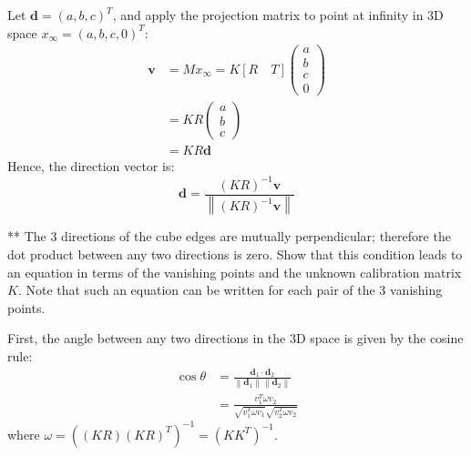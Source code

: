\begin{questions}
\begin{parts}
\begin{subparts}
    \begin{solution}
        Let $\mathbf{d}=(a, b, c) ^ {T}$, and apply the projection matrix to point at infinity in 3D space $x _ {\infty} = (a, b, c, 0) ^ {T}$:
        \begin{equation}
                    \begin{split}
            \mathbf{v} &= M x _ {\infty} = K \left[R \quad T\right] \left( \begin{array}{c}
                 a  \\
                 b  \\
                 c  \\
                 0
            \end{array} \right) \\
            &= K R \left( \begin{array}{c}
                 a  \\
                 b  \\
                 c  
            \end{array} \right) \\
            &= K R \mathbf{d}
        \end{split}
        \end{equation}
        Hence, the direction vector is:
        \begin{equation}
            \mathbf { d } = \frac { (KR) ^ { - 1 }   \mathbf{v}  } { \left\| (KR) ^ { - 1 }  \mathbf{v}  \right\| }
        \end{equation}
        
        
    \end{solution}
    
    \subpart
    ** The 3 directions of the cube edges are mutually perpendicular; therefore the dot product between any two directions is zero. Show that this condition leads to an equation in terms of the vanishing points and the unknown calibration matrix $K$. Note that such an equation can be written for each pair of the 3 vanishing points.
    
    \begin{solution}
        First, the angle between any two directions in the 3D space is given by the cosine rule:
        \begin{equation}
            \begin{aligned} \cos \theta & = \frac { \mathbf{d} _ { 1 } \cdot \mathbf{d} _ { 2 } } { \left\| \mathbf{d} _ { 1 } \right\| \left\| \mathbf{d} _ { 2 } \right\| } \\ & = \frac { v _ { 1 } ^ { T } \omega v _ { 2 } } { \sqrt { v _ { 1 } ^ { T } \omega v _ { 1 } } \sqrt { v _ { 2 } ^ { T } \omega v _ { 2 } } } \end{aligned}
        \end{equation}
        where $\omega = \left( (KR) (KR) ^ { T } \right) ^ { - 1 } = \left( K K ^ { T } \right) ^ { - 1 }$.
        

\end{solution}
\end{subparts}
\end{parts}
\end{questions}

